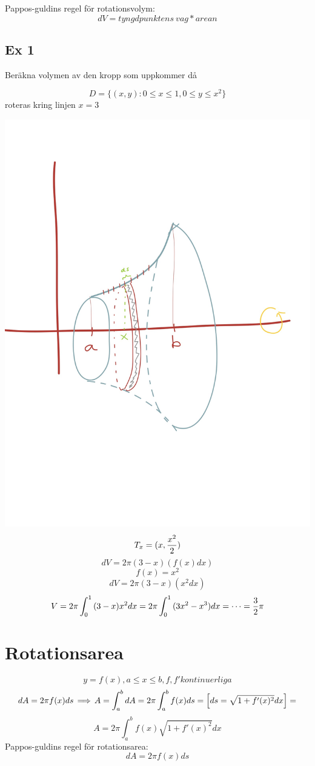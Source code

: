 \documentclass{article}
\begin{document}
Pappos-guldins regel för rotationsvolym:
$$ dV = tyngdpunktens\ vag * arean $$

\subsection{Ex 1}
Beräkna volymen av den kropp som uppkommer då

$$ D=\{ (x,y) : 0\le x\le 1, 0\le y\le x^2 \} $$
roteras kring linjen $x=3$

\includegraphics[scale=0.15]{img/img5.jpg}
$$T_x=(x, \frac{x^2}{2}) $$
$$ dV= 2\pi(3-x)(f(x) dx)$$
$$ f(x) = x^2 $$
$$ dV= 2\pi(3-x)(x^2 dx)$$
$$ V=2\pi\int^1_0{(3-x)x^2dx}=2\pi\int_0^1{(3x^2-x^3)dx} = \dots = \frac{3}{2} \pi $$

\section{Rotationsarea}
$$ y=f(x), a\le x\le b, f, f' kontinuerliga $$
$$ dA = 2\pi f(x) ds \operatorname{\implies} A = \int_a^b dA = 2\pi \int^b_a f(x) ds =
\left[ds = \sqrt{1+f'(x)^2} dx\right] =$$
$$A = 2\pi \int_a^b{f(x)\sqrt{1+f'(x)^2} dx} $$
Pappos-guldins regel för rotationsarea:
$$ dA=2\pi f(x) ds $$
\end{document}
